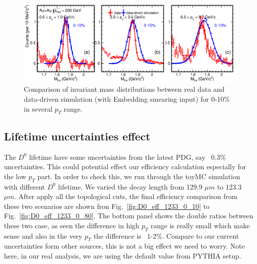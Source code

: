 \begin{figure}[htbp]
\centering
\includegraphics[keepaspectratio,width=1.0\textwidth,angle=0]{figure/Run14_D0HFT/sigmal_fastsimudata_vs_data_0_10_withTPCmomentR.eps}
\caption{Comparison of invariant mass distributions between real data and data-driven simulation (with Embedding smearing input) for 0-10\% in several $p_{T}$ range.}
\label{sigmal_fastsimudata_vs_data_0_10_withTPCmomentR}
\end{figure}

\subsection{Lifetime uncertainties effect} 

The $D^0$ lifetime have some uncertainties from the latest PDG, say ~0.3\% uncertainties. This could potential effect our efficiency calculation especially for the low $p_T$ part. In order to check this, we run through the toyMC simulation with different $D^0$ lifetime. We varied the decay length from 129.9 $\mu m$ to 123.3 $\mu m$. After apply all the topological cuts, the final efficiency comparison from these two scenarios are shown fron Fig.~\ref{fig:D0_eff_1233_0_10} to Fig.~\ref{fig:D0_eff_1233_0_80}. The bottom panel shows the double ratios between these two case, as seen the difference in high $p_T$ range is really small which make sense and also in the very $p_T$ the difference is ~1-2\%. Compare to our current uncertainties form other sources, this is not a big effect we need to worry. Note here, in our real analysis, we are using the default value from PYTHIA setup.

